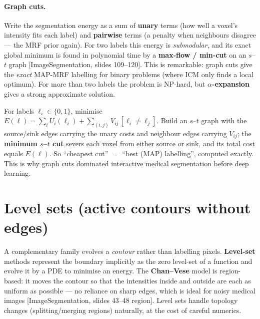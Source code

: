 \documentclass[11pt]{article}
\newcommand{\deck}[1]{\textsf{\small[#1]}}
\begin{document}
\paragraph{Graph cuts.} Write the segmentation energy as a sum of \textbf{unary}
terms (how well a voxel's intensity fits each label) and \textbf{pairwise} terms
(a penalty when neighbours disagree --- the MRF prior again). For two labels this
energy is \emph{submodular}, and its exact global minimum is found in polynomial
time by a \textbf{max-flow / min-cut} on an $s$--$t$ graph
\deck{ImageSegmentation, slides 109--120}. This is remarkable: graph cuts give the
\emph{exact} MAP-MRF labelling for binary problems (where ICM only finds a local
optimum). For more than two labels the problem is NP-hard, but
\textbf{$\alpha$-expansion} gives a strong approximate solution.

\begin{notebox}
For labels $\ell_i\in\{0,1\}$, minimise
$E(\ell)=\sum_i U_i(\ell_i) + \sum_{(i,j)} V_{ij}\,[\ell_i\neq\ell_j]$. Build an
$s$--$t$ graph with the source/sink edges carrying the unary costs and
neighbour edges carrying $V_{ij}$; the \textbf{minimum $s$--$t$ cut} severs each
voxel from either source or sink, and its total cost equals $E(\ell)$. So
``cheapest cut'' $=$ ``best (MAP) labelling'', computed exactly. This is why graph
cuts dominated interactive medical segmentation before deep learning.
\end{notebox}

\section{Level sets (active contours without edges)}

A complementary family evolves a \emph{contour} rather than labelling pixels.
\textbf{Level-set} methods represent the boundary implicitly as the zero
level-set of a function and evolve it by a PDE to minimise an energy. The
\textbf{Chan--Vese} model is region-based: it moves the contour so that the
intensities inside and outside are each as uniform as possible --- no reliance on
sharp edges, which is ideal for noisy medical images \deck{ImageSegmentation,
slides 43--48 region}. Level sets handle topology changes (splitting/merging
regions) naturally, at the cost of careful numerics.
\end{document}
